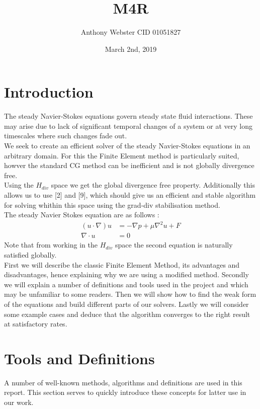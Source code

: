 \documentclass[11pt,twoside,a4paper]{article}
\begin{document}
\setcounter{secnumdepth}{4}
\title{M4R}
\date{March 2nd, 2019}
\author{Anthony Webster CID 01051827}
\maketitle

\tableofcontents

\section{Introduction}
The steady Navier-Stokes equations govern steady state fluid interactions. These may arise due to lack of significant temporal changes of a system or at very long timescales where such changes fade out.\\
We seek to create an efficient solver of the steady Navier-Stokes equations in an arbitrary domain.
For this the Finite Element method is particularly suited, howver the standard CG method can be inefficient and is not globally divergence free.\\
Using the $H_{div}$ space we get the global divergence free property. Additionally this allows us to use [2] and [9], which should give us an efficient and stable algorithm for solving whithin this space using the grad-div stabilisation method.\\
The steady Navier Stokes equation are as follows :
\begin{align}
(u \cdot \nabla) u &= -\nabla p + \mu \nabla^2 u + F \\
\nabla \cdot u &= 0
\end{align}
Note that from working in the $H_{div}$ space the second equation is naturally satisfied globally.
\\
First we will describe the classic Finite Element Method, its advantages and disadvantages, hence explaining why we are using a modified method. Secondly we will explain a number of definitions and tools used in the project and which may be unfamiliar to some readers. Then we will show how to find the weak form of the equations and build different parts of our solvers. Lastly we will consider some example cases and deduce that the algorithm converges to the right result at satisfactory rates.\\

\section{Tools and Definitions}
A number of well-known methods, algorithms and definitions are used in this report. This section serves to quickly introduce these concepts for latter use in our work.
\end{document}
